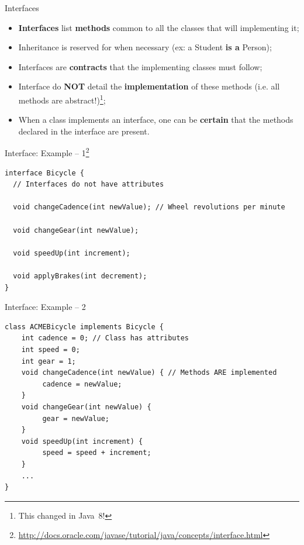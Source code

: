 \documentclass[English,c,%
hyperref={%
    pdftitle={FISA-DE2 Java Inheritance},%
    pdfauthor={Muller, Gravier, Laforest, Subercaze},%
    pdfsubject={Java Inheritance},%
    pdfkeywords={Inheritance, Java},%
    colorlinks=true,%
    urlcolor=blue,%
    linkcolor=%
    },%
xcolor={pdftex,svgnames} %
]{beamer}
\begin{document}
\begin{frame}{Interfaces}
\begin{itemize}
    \item \textbf{Interfaces} list \textbf{methods} common to all the classes that will implementing it;
    \item Inheritance is reserved for when necessary (ex: a Student \textbf{is a} Person);
    \item Interfaces are \textbf{contracts} that the implementing classes must follow;
    \item Interface do \textbf{NOT} detail the \textbf{implementation} of these methods (i.e. all methods are abstract!)\footnote{This changed in Java~8!};
    \item When a class implements an interface, one can be \textbf{certain} that the methods declared in the interface are present.
\end{itemize}
\end{frame}




\begin{frame}[fragile]{Interface: Example -- 1\footnote{\url{http://docs.oracle.com/javase/tutorial/java/concepts/interface.html}}}
\vspace{-1em}
\begin{lstlisting}[escapechar=\%,label=intex,caption=Bicycle.java,basicstyle=\footnotesize]
interface Bicycle {
  // Interfaces do not have attributes

  void changeCadence(int newValue); // Wheel revolutions per minute

  void changeGear(int newValue);

  void speedUp(int increment);

  void applyBrakes(int decrement);
}
\end{lstlisting}

\end{frame}


\begin{frame}[fragile]{Interface: Example -- 2}
\vspace{-1.2em}
\begin{lstlisting}[escapechar=\%,label=intex,caption=ACMEBicycle.java,basicstyle=\footnotesize]
class ACMEBicycle implements Bicycle {
    int cadence = 0; // Class has attributes
    int speed = 0;
    int gear = 1;
    void changeCadence(int newValue) { // Methods ARE implemented
         cadence = newValue;
    }
    void changeGear(int newValue) {
         gear = newValue;
    }
    void speedUp(int increment) {
         speed = speed + increment;
    }
    ...
}
\end{lstlisting}
\end{frame}
\end{document}
